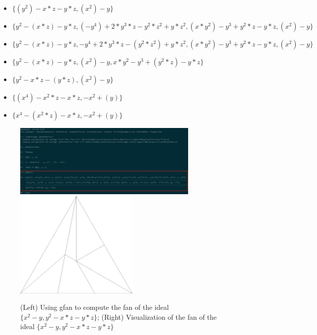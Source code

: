 \begin{example}
\begin{itemize}
    \begin{itemize}
      \item $\{(y^2) - x*z - y*z, (x^2) - y\}$
      \item $\{y^2 - (x*z) - y*z, (-y^4) + 2*y^3*z - y^2*z^2 + y*z^2, (x*y^2) - y^3 + y^2*z - y*z, (x^2) - y\}$
      \item $\{y^2 - (x*z) - y*z, -y^4 + 2*y^3*z - (y^2*z^2) + y*z^2, (x*y^2) - y^3 + y^2*z - y*z, (x^2) - y\}$
      \item $\{y^2 - (x*z) - y*z, (x^2) - y, x*y^2 - y^3 + (y^2*z) - y*z\}$
      \item $\{y^2 - x*z - (y*z), (x^2) - y\}$
      \item $\{(x^4) - x^2*z - x*z, -x^2 + (y)\}$
      \item $\{x^4 - (x^2*z) - x*z, -x^2 + (y)\}$
    \end{itemize}
  \end{itemize}
  
  \begin{figure}[h]
    \centering
    \includegraphics[width=9cm]{gfanIdeal1}
    \includegraphics[width=6cm]{ideal1}
    \caption{(Left) Using gfan to compute the \grob fan of the ideal
      $\{x^2  - y, y^2  - x*z - y*z\}$; (Right) Visualization of the \grob
    fan of the ideal $\{x^2  - y, y^2  - x*z - y*z\}$}
  \end{figure}
\end{example}


